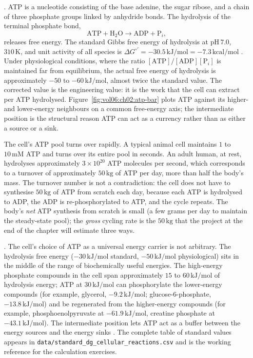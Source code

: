 . ATP is a nucleotide consisting of
the base adenine, the sugar ribose, and a chain of three phosphate
groups linked by anhydride bonds. The hydrolysis of the terminal
phosphate bond,
\[
\text{ATP} + \text{H}_2\text{O} \longrightarrow \text{ADP} + \text{P}_i,
\]
releases free energy. The standard Gibbs free energy of hydrolysis at
$\text{pH}\,7.0$, $310\,\si{\kelvin}$, and unit activity of all
species is $\Delta G^{\circ\prime} = -30.5\,\text{kJ}/\text{mol} =
-7.3\,\text{kcal}/\text{mol}$ \cite[ch.~13]{text:lehninger-biochemistry}.
Under physiological conditions, where the ratio
$[\text{ATP}]/[\text{ADP}][\text{P}_i]$ is maintained far from
equilibrium, the actual free energy of hydrolysis is approximately
$-50$ to $-60\,\text{kJ}/\text{mol}$, almost twice the standard value.
The corrected value is the engineering value: it is the work that the
cell can extract per ATP hydrolysed. Figure~\ref{fig:vol06:ch02:atp-bar}
plots ATP against its higher- and lower-energy neighbours on a common
free-energy axis; the intermediate position is the structural reason
ATP can act as a currency rather than as either a source or a sink.



The cell's ATP pool turns over rapidly. A typical animal cell
maintains $1$ to $10\,\text{mM}$ ATP and turns over its entire pool
in seconds. An adult human, at rest, hydrolyses approximately
$3 \times 10^{20}$ ATP molecules per second, which corresponds to
a turnover of approximately $50\,\text{kg}$ of ATP per day, more
than half the body's mass. The turnover number is not a contradiction:
the cell does not have to synthesise $50\,\text{kg}$ of ATP from
scratch each day, because each ATP is hydrolysed to ADP, the ADP is
re-phosphorylated to ATP, and the cycle repeats. The body's
\emph{net} ATP synthesis from scratch is small (a few grams per day
to maintain the steady-state pool); the \emph{gross} cycling rate is
the $50\,\text{kg}$ that the project at the end of the chapter will
estimate three ways.

. The cell's choice of ATP as a universal energy
carrier is not arbitrary. The hydrolysis free energy ($-30\,\text{kJ}/
\text{mol}$ standard, $-50\,\text{kJ}/\text{mol}$ physiological) sits
in the middle of the range of biochemically useful energies. The
high-energy phosphate compounds in the cell span approximately
$15$ to $60\,\text{kJ}/\text{mol}$ of hydrolysis energy; ATP at
$30\,\text{kJ}/\text{mol}$ can phosphorylate the lower-energy
compounds (for example, glycerol, $-9.2\,\text{kJ}/\text{mol}$;
glucose-6-phosphate, $-13.8\,\text{kJ}/\text{mol}$) and be regenerated
from the higher-energy compounds (for example, phosphoenolpyruvate at
$-61.9\,\text{kJ}/\text{mol}$, creatine phosphate at
$-43.1\,\text{kJ}/\text{mol}$). The intermediate position lets ATP
act as a buffer between the energy sources and the energy sinks
\cite[ch.~13]{text:lehninger-biochemistry}. The complete table of
standard values appears in \texttt{data/standard\_dg\_cellular\_reactions.csv}
and is the working reference for the calculation exercises.

